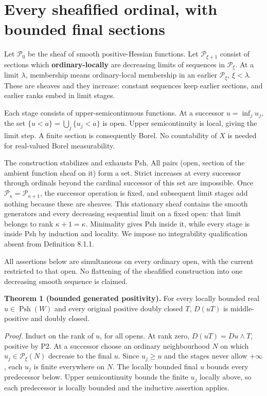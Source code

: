 \documentclass[
  11pt,
]{article}
\begin{document}
\section{Every sheafified ordinal, with bounded final
sections}\label{every-sheafified-ordinal-with-bounded-final-sections}

Let \(\mathcal P_0\) be the sheaf of smooth positive-Hessian functions.
Let \(\mathcal P_{\xi+1}\) consist of sections which
\textbf{ordinary-locally} are decreasing limits of sequences in
\(\mathcal P_\xi\). At a limit \(\lambda\), membership means
ordinary-local membership in an earlier \(\mathcal P_\xi\),
\(\xi<\lambda\). These are sheaves and they increase: constant sequences
keep earlier sections, and earlier ranks embed in limit stages.

Each stage consists of upper-semicontinuous functions. At a successor
\(u=\inf_j u_j\), the set \(\{u<a\}=\bigcup_j\{u_j<a\}\) is open. Upper
semicontinuity is local, giving the limit step. A finite section is
consequently Borel. No countability of \(X\) is needed for real-valued
Borel measurability.

The construction stabilizes and exhausts Psh. All pairs (open, section
of the ambient function sheaf on it) form a set. Strict increases at
every successor through ordinals beyond the cardinal successor of this
set are impossible. Once \(\mathcal P_\kappa=\mathcal P_{\kappa+1}\),
the successor operation is fixed, and subsequent limit stages add
nothing because these are sheaves. This stationary sheaf contains the
smooth generators and every decreasing sequential limit on a fixed open:
that limit belongs to rank \(\kappa+1=\kappa\). Minimality gives Psh
inside it, while every stage is inside Psh by induction and locality. We
impose no integrability qualification absent from Definition 8.1.1.

All assertions below are simultaneous on every ordinary open, with the
current restricted to that open. No flattening of the sheafified
construction into one decreasing smooth sequence is claimed.

\textbf{Theorem 1 (bounded generated positivity).} For every locally
bounded real \(u\in\operatorname{Psh}(W)\) and every original positive
doubly closed \(T\), \(D(uT)\) is middle-positive and doubly closed.

\emph{Proof.} Induct on the rank of \(u\), for all opens. At rank zero,
\(D(uT)=Du\wedge T\), positive by P2. At a successor choose an ordinary
neighbourhood \(N\) on which \(u_j\in\mathcal P_\xi(N)\) decrease to the
final \(u\). Since \(u_j\geq u\) and the stages never allow \(+\infty\),
each \(u_j\) is finite everywhere on \(N\). The locally bounded final
\(u\) bounds every predecessor below. Upper semicontinuity bounds the
finite \(u_j\) locally above, so each predecessor is locally bounded and
the inductive assertion applies.
\end{document}
